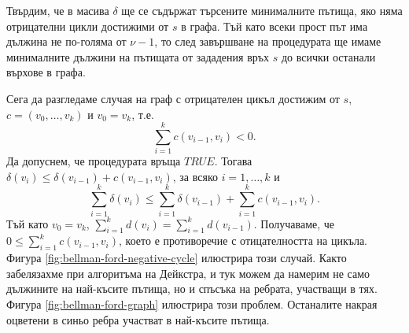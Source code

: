 Твърдим, че в масива $\delta$ ще се съдържат търсените минималните пътища, яко няма отрицателни цикли достижими от $s$ в графа.
Тъй като всеки прост път има дължина не по-голяма от $\nu-1$, то след завършване на процедурата ще имаме минималните 
дължини на пътищата от зададения връх $s$ до всички останали върхове в графа.

Сега да разгледаме случая на граф с отрицателен цикъл достижим от $s$, $c = (v_0,\dots,v_k)$ и $v_0 = v_k$, т.е.
\[\sum^{k}_{i=1}c(v_{i-1},v_i) < 0.\]
Да допуснем, че процедурата връща $TRUE$. Тогава $\delta(v_i) \leq \delta(v_{i-1}) + c(v_{i-1},v_i)$, за всяко $i=1,\dots,k$ и
\[\sum^{k}_{i=1} \delta(v_i) \leq \sum^{k}_{i=1}\delta(v_{i-1}) + \sum^{k}_{i=1}c(v_{i-1},v_i).\]
Тъй като $v_0 = v_k$, $\sum^{k}_{i=1} d(v_i) = \sum^{k}_{i=1}d(v_{i-1})$.
Получаваме, че $0 \leq \sum^{k}_{i=1}c(v_{i-1},v_i)$, което е противоречие с отицателността на цикъла.
Фигура \ref{fig:bellman-ford-negative-cycle} илюстрира този случай.
Както забелязахме при алгоритъма на Дейкстра, и тук можем да намерим не само дължините на най-късите пътища, но
и спъсъка на ребрата, участващи в тях. Фигура \ref{fig:bellman-ford-graph} илюстрира този проблем. 
Останалите накрая оцветени в синьо ребра участват в най-късите пътища.



